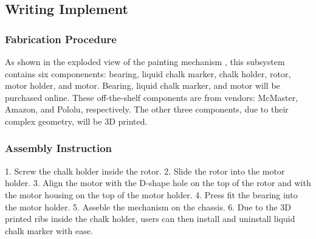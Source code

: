 
\subsection{Writing Implement}
\label{sec:hardware_writing_implement}

\subsubsection{Fabrication Procedure}
\label{sec:writing_fab}
As shown in the exploded view of the painting mechanism , this subsystem contains six componenents: bearing, liquid chalk marker, chalk holder, rotor, motor holder, and motor. Bearing, liquid chalk marker, and motor will be purchased online. These off-the-shelf components are from vendors: McMaster, Amazon, and Pololu, respectively. The other three components, due to their complex geometry, will be 3D printed. 

\subsubsection{Assembly Instruction}
\label{sec:writing_assemb}
1. Screw the chalk holder inside the rotor.
2. Slide the rotor into the motor holder. 
3. Align the motor with the D-shape hole on the top of the rotor and with the motor housing on the top of the motor holder.
4. Press fit the bearing into the motor holder.
5. Asseble the mechanism on the chassis.
6. Due to the 3D printed ribs inside the chalk holder, users can then install and uninstall liquid chalk marker with ease.